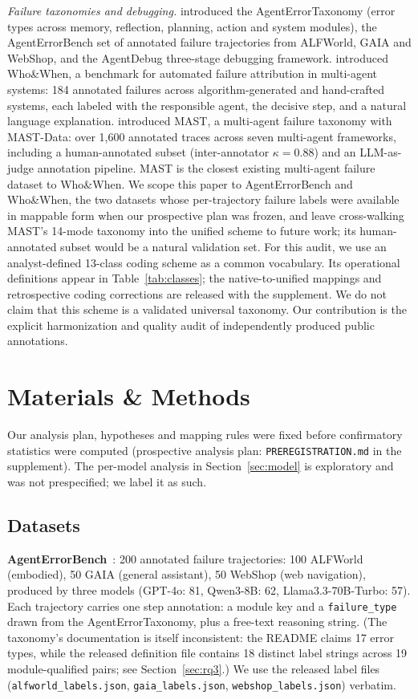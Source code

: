 \documentclass[12pt,letterpaper]{article}
\begin{document}
\emph{Failure taxonomies and debugging.} \cite{zhu2025agentdebug}
introduced the AgentErrorTaxonomy (error types across memory, reflection,
planning, action and system modules), the AgentErrorBench set of annotated
failure trajectories from ALFWorld, GAIA and WebShop, and the AgentDebug
three-stage debugging framework. \cite{zhang2025whowhen}
introduced Who\&When, a benchmark for automated failure attribution
in multi-agent systems: 184 annotated failures across algorithm-generated and
hand-crafted systems, each labeled with the responsible agent, the decisive
step, and a natural language explanation. \cite{cemri2025mast} introduced
MAST, a multi-agent failure taxonomy with MAST-Data: over 1,600 annotated
traces across seven multi-agent frameworks, including a human-annotated
subset (inter-annotator $\kappa{=}0.88$) and an LLM-as-judge annotation
pipeline. MAST is the closest existing multi-agent failure dataset to
Who\&When. We scope this paper to AgentErrorBench and Who\&When, the two
datasets whose per-trajectory failure labels were available in mappable form
when our prospective plan was frozen, and leave cross-walking MAST's
14-mode taxonomy into the unified scheme to future work; its human-annotated
subset would be a natural validation set. For this audit, we use an analyst-defined 13-class coding scheme as a common
vocabulary. Its operational definitions appear in Table~\ref{tab:classes};
the native-to-unified mappings and retrospective coding corrections are
released with the supplement. We do not claim that this scheme is a
validated universal taxonomy. Our contribution is the explicit harmonization
and quality audit of independently produced public annotations.

\section{Materials \& Methods}
Our analysis plan, hypotheses and mapping rules were fixed before
confirmatory statistics were computed (prospective analysis plan:
\texttt{PREREGISTRATION.md} in the supplement). The per-model
analysis in Section~\ref{sec:model} is exploratory and was not prespecified; we label
it as such.

\subsection{Datasets}
\label{sec:datasets}
\textbf{AgentErrorBench}~\cite{zhu2025agentdebug}: 200 annotated failure
trajectories: 100 ALFWorld (embodied), 50 GAIA (general assistant), 50
WebShop (web navigation), produced by three models (GPT-4o: 81, Qwen3-8B:
62, Llama3.3-70B-Turbo: 57). Each trajectory carries one step annotation: a
module key and a \texttt{failure\_type} drawn from the AgentErrorTaxonomy,
plus a free-text reasoning string. (The taxonomy's documentation is itself
inconsistent: the README claims 17 error types, while the released
definition file contains 18 distinct label strings across 19
module-qualified pairs; see Section~\ref{sec:rq3}.) We use the released label files
(\texttt{alfworld\_labels.json}, \texttt{gaia\_labels.json},
\texttt{webshop\_labels.json}) verbatim.
\end{document}
